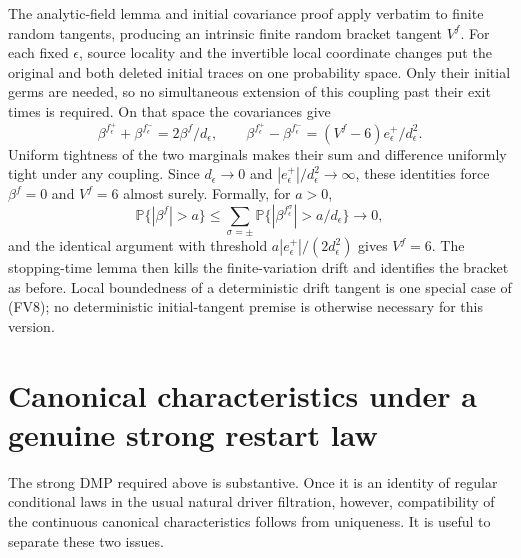 \documentclass[11pt]{article}
\theoremstyle{definition}\newtheorem{definition}[theorem]{Definition}
\theoremstyle{remark}\newtheorem{remark}[theorem]{Remark}
\begin{document}
The analytic-field lemma and initial covariance proof apply verbatim to
finite random tangents, producing an intrinsic finite random bracket
tangent $V^f$. For each fixed $\epsilon$, source locality and the
invertible local coordinate changes put the original and both deleted
initial traces on one probability space. Only their initial germs are
needed, so no simultaneous extension of this coupling past their exit times
is required. On that space the covariances give
\[
 \beta^{f_\epsilon^+}+\beta^{f_\epsilon^-}
       =2\beta^f/d_\epsilon,
 \qquad
 \beta^{f_\epsilon^+}-\beta^{f_\epsilon^-}
       =(V^f-6)e_\epsilon^+/d_\epsilon^2.
\]
Uniform tightness of the two marginals makes their sum and difference
uniformly tight under any coupling. Since $d_\epsilon\to0$ and
$|e_\epsilon^+|/d_\epsilon^2\to\infty$, these identities force
$\beta^f=0$ and $V^f=6$ almost surely. Formally, for $a>0$,
\[
 \mathbb P\{|\beta^f|>a\}
 \le \sum_{\sigma=\pm}
       \mathbb P\{|\beta^{f_\epsilon^\sigma}|>a/d_\epsilon\}
       \longrightarrow0,
\]
and the identical argument with threshold
$a|e_\epsilon^+|/(2d_\epsilon^2)$ gives $V^f=6$.
The stopping-time lemma then kills the finite-variation drift and identifies
the bracket as before. Local boundedness of a deterministic drift tangent
is one special case of (FV8); no deterministic initial-tangent premise is
otherwise necessary for this version.


\section{Canonical characteristics under a genuine strong restart law}
\label{sec:canonical-restart-automatic}

The strong DMP required above is substantive. Once it is an identity of
regular conditional laws in the usual natural driver filtration, however,
compatibility of the continuous canonical characteristics follows from
uniqueness. It is useful to separate these two issues.
\end{document}
